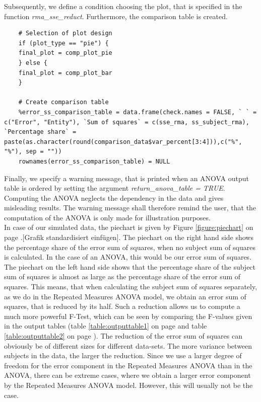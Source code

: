 \documentclass[11pt]{article}
\begin{document}
	Subsequently, we define a condition choosing the plot, that is specified in the function \textit{rma_sse_reduct}. Furthermore, the comparison table is created.
	
	\begin{lstlisting}  
	# Selection of plot design    
	if (plot_type == "pie") {
	final_plot = comp_plot_pie
	} else {
	final_plot = comp_plot_bar
	}
	
	# Create comparison table
	%error_ss_comparison_table = data.frame(check.names = FALSE, ` ` = c("Error", "Entity"), `Sum of squares` = c(sse_rma, ss_subject_rma), `Percentage share` = paste(as.character(round(comparison_data$var_percent[3:4])),c("%", "%"), sep = ""))
	rownames(error_ss_comparison_table) = NULL
	\end{lstlisting}
	
	Finally, we specify a warning message, that is printed when an ANOVA output table is ordered by setting the argument \textit{return_anova_table = TRUE}. Computing the ANOVA neglects the dependency in the data and gives misleading results. The warning message shall therefore remind the user, that the computation of the ANOVA is only made for illustration purposes.\\
	
	In case of our simulated data, the piechart is given by Figure \ref{figure:piechart} on page \pageref{figure:piechart}.[Grafik standardisiert einfügen]. The piechart on the right hand side shows the percentage share of the error sum of squares, when no subject sum of squares is calculated. In the case of an ANOVA, this would be our error sum of squares. The piechart on the left hand side shows that the percentage share of the subject sum of squares is almost as large as the percentage share of the error sum of squares. This means, that when calculating the subject sum of squares separately, as we do in the Repeated Measures ANOVA model, we obtain an error sum of squares, that is reduced by its half. Such a reduction allows us to compute a much more powerful F-Test, which can be seen by comparing the F-values given in the output tables (table \ref{table:outputtable1} on page \pageref{table:outputtable1} and table \ref{table:outputtable2} on page \pageref{output:outputtable2}). The reduction of the error sum of squares can obviously be of different sizes for different data-sets. The more variance between subjects in the data, the larger the reduction. Since we use a larger degree of freedom for the error component in the Repeated Measures ANOVA than in the ANOVA, there can be extreme cases, where we obtain a larger error component by the Repeated Measures ANOVA model. However, this will usually not be the case.
	
\end{document}
